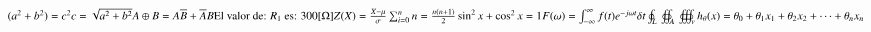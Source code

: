 \documentclass{article}
\begin{document}
	$( a^2+b^2)=c^2\\\\ c=\sqrt{a^2+b^2}\\\\
	A\oplus B=A\overline{B}+\overline{A}B \\\\
	\text{El valor de: } R_1 \text{ es: } 300[\Omega] \\\\
	Z(X)=\frac{X-\mu}{\sigma}\\\\
	\sum_{i=0}^nn=\frac{n(n+1)}{2}\\\\
	\sin^2{x}+\cos^2{x}=1\\\\
	F(\omega)=\int^\infty_{-\infty}{f(t)e^{-j\omega t}\delta t}\\
	\oint_L\\\oiint_A\\\oiiint_v\\
	h_\theta(x)=\theta_0+\theta_1x_1+\theta_2x_2+\dots+\theta_nx_n$
\end{document}
